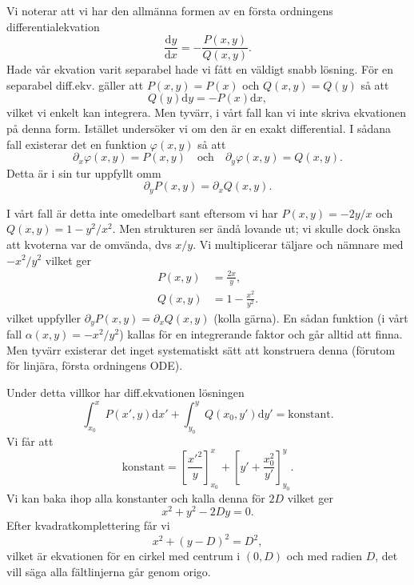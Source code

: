 \documentclass[%
oneside,                 %
final,                   %
10pt]{article}
\begin{document}
Vi noterar att vi har den allmänna formen av en första ordningens differentialekvation
\begin{equation}
\frac{\mbox{d}y}{\mbox{d}x} = - \frac{P(x,y)}{Q(x,y)}.
\end{equation}
Hade vår ekvation varit separabel hade vi fått en väldigt snabb lösning. För en separabel diff.ekv. gäller att $P(x,y)=P(x)$ och $Q(x,y)=Q(y)$ så att
\begin{equation}
Q(y) \mbox{d}y = -P(x) \mbox{d}x,
\end{equation}
vilket vi enkelt kan integrera. Men tyvärr, i vårt fall kan vi inte skriva ekvationen på denna form. Istället undersöker vi om den är en exakt differential. I sådana fall existerar det en funktion $\varphi(x,y)$ så att
\begin{equation}
\partial_x \varphi(x,y) = P(x,y) \quad \mathrm{och} \quad \partial_y \varphi(x,y) = Q(x,y).
\end{equation}
Detta är i sin tur uppfyllt omm
\begin{equation}
\partial_y P(x,y) = \partial_x Q(x,y).
\label{exaktdiff}
\end{equation}

I vårt fall är detta inte omedelbart sant eftersom vi har $P(x,y) = - 2y/x$ och $Q(x,y) = 1-y^2/x^2$. Men strukturen ser ändå lovande ut; vi skulle dock önska att kvoterna var de omvända, dvs $x/y$. Vi multiplicerar täljare och nämnare med $-x^2/y^2$ vilket ger
\begin{align}
P(x,y) &= \frac{2x}{y},\\ 
Q(x,y) &= 1 - \frac{x^2}{y^2}.
\end{align}
vilket uppfyller $\partial_y P(x,y) = \partial_x Q(x,y)$ (kolla gärna). En sådan funktion (i vårt fall $\alpha(x,y) = -x^2/y^2$) kallas för en integrerande faktor och går alltid att finna. Men tyvärr existerar det inget systematiskt sätt att konstruera denna (förutom för linjära, första ordningens ODE).

Under detta villkor har diff.ekvationen lösningen
\begin{equation}
\int_{x_0}^x P(x',y) \mbox{d}x' + \int_{y_0}^y Q(x_0,y') \mbox{d}y' = \mathrm{konstant}. 
\end{equation}
Vi får att
\begin{equation}
\mathrm{konstant} = \left[ \frac{x'^2}{y} \right]_{x_0}^x + \left[ y' + \frac{x_0^2}{y'} \right]_{y_0}^y. 
\end{equation}
Vi kan baka ihop alla konstanter och kalla denna för $2D$ vilket ger
\begin{equation}
x^2 + y^2 - 2 D y = 0.
\end{equation}
Efter kvadratkomplettering får vi
\begin{equation}
  x^2 + \left(y-D\right)^2 = D^2,
\end{equation}
vilket är ekvationen för en cirkel med centrum i $(0,D)$ och med radien $D$, det vill säga alla fältlinjerna går genom origo.
\end{document}

